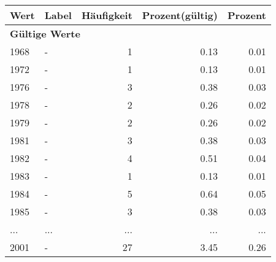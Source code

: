      \begin{longtable}{lXrrr}
     \toprule
     \textbf{Wert} & \textbf{Label} & \textbf{Häufigkeit} & \textbf{Prozent(gültig)} & \textbf{Prozent} \\
     \endhead
     \midrule
     \multicolumn{5}{l}{\textbf{Gültige Werte}}\\
        1968 & \multicolumn{1}{X}{-} & %
          \num{1} &
          \num[round-mode=places,round-precision=2]{0,13} &
          \num[round-mode=places,round-precision=2]{0,01} \\
        1972 & \multicolumn{1}{X}{-} & %
          \num{1} &
          \num[round-mode=places,round-precision=2]{0,13} &
          \num[round-mode=places,round-precision=2]{0,01} \\
        1976 & \multicolumn{1}{X}{-} & %
          \num{3} &
          \num[round-mode=places,round-precision=2]{0,38} &
          \num[round-mode=places,round-precision=2]{0,03} \\
        1978 & \multicolumn{1}{X}{-} & %
          \num{2} &
          \num[round-mode=places,round-precision=2]{0,26} &
          \num[round-mode=places,round-precision=2]{0,02} \\
        1979 & \multicolumn{1}{X}{-} & %
          \num{2} &
          \num[round-mode=places,round-precision=2]{0,26} &
          \num[round-mode=places,round-precision=2]{0,02} \\
        1981 & \multicolumn{1}{X}{-} & %
          \num{3} &
          \num[round-mode=places,round-precision=2]{0,38} &
          \num[round-mode=places,round-precision=2]{0,03} \\
        1982 & \multicolumn{1}{X}{-} & %
          \num{4} &
          \num[round-mode=places,round-precision=2]{0,51} &
          \num[round-mode=places,round-precision=2]{0,04} \\
        1983 & \multicolumn{1}{X}{-} & %
          \num{1} &
          \num[round-mode=places,round-precision=2]{0,13} &
          \num[round-mode=places,round-precision=2]{0,01} \\
        1984 & \multicolumn{1}{X}{-} & %
          \num{5} &
          \num[round-mode=places,round-precision=2]{0,64} &
          \num[round-mode=places,round-precision=2]{0,05} \\
        1985 & \multicolumn{1}{X}{-} & %
          \num{3} &
          \num[round-mode=places,round-precision=2]{0,38} &
          \num[round-mode=places,round-precision=2]{0,03} \\
       ... & ... & ... & ... & ... \\
        2001 & \multicolumn{1}{X}{-} & %
          \num{27} &
          \num[round-mode=places,round-precision=2]{3,45} &
          \num[round-mode=places,round-precision=2]{0,26} \\


\end{longtable}
